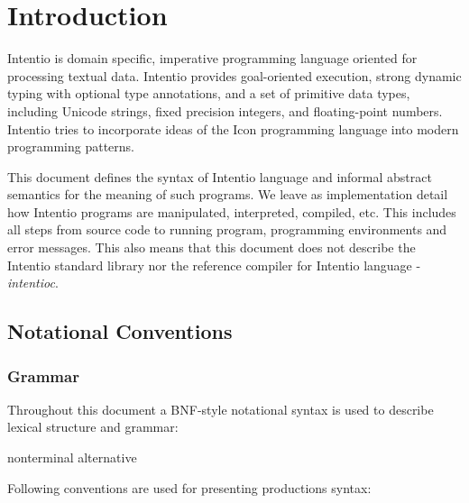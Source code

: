 \chapter{Introduction}

Intentio is domain specific, imperative programming language oriented for processing textual data. Intentio provides goal-oriented execution, strong dynamic typing with optional type annotations, and a set of primitive data types, including Unicode strings, fixed precision integers, and floating-point numbers. Intentio tries to incorporate ideas of the Icon\cite{TheIconProgrammingLanguage} programming language into modern programming patterns.


This document defines the syntax of Intentio language and informal abstract semantics for the meaning of such programs. We leave as implementation detail how Intentio programs are manipulated, interpreted, compiled, etc. This includes all steps from source code to running program, programming environments and error messages. This also means that this document does not describe the Intentio standard library nor the reference compiler for Intentio language - \emph{intentioc}\cite{intentioc}.


\section{Notational Conventions}

\subsection*{Grammar}

Throughout this document a BNF-style notational syntax is used to describe lexical structure and grammar:

\begin{bnf}
  nonterminal \eq {} \gor alternative
\end{bnf}

Following conventions are used for presenting productions syntax:

